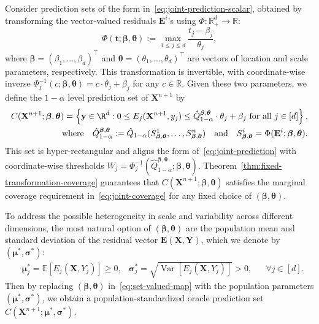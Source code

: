 {\color{blue}
Consider prediction sets of the form in~\eqref{eq:joint-prediction-scalar}, obtained by transforming the vector-valued residuals $\mathbf{E}^i$'s using $\Phi : \mathbb{R}^{d}_+ \to \mathbb{R}$:
\begin{equation}
\Phi(\mathbf t; \boldsymbol \beta, \boldsymbol \theta)
:= \max_{1 \le j \le d} \frac{t_j - \beta_j}{\theta_j},
\label{eq:residual-transformation}
\end{equation}
where $\boldsymbol \beta = (\beta_1, \ldots, \beta_d)^\top$ and $\boldsymbol \theta = (\theta_1, \ldots, \theta_d)^\top$ are vectors of location and scale parameters, respectively. 
This transformation is invertible, with coordinate-wise inverse $\Phi^{-1}_j (c; \boldsymbol \beta, \boldsymbol \theta) = c \cdot \theta_j + \beta_j$ for any $c \in \mathbb{R}$. 
Given these two parameters,  we define the $1-\alpha$ level prediction set of $\mathbf{X}^{n+1}$ by
\begin{equation}\label{eq:set-valued-map}
\begin{aligned}
C(\mathbf{X}^{n+1};\boldsymbol \beta, \boldsymbol \theta) = \left\{\mathbf y \in \R^d: 0\leq E_j(\mathbf{X}^{n+1}, y_j) \leq {\hat{Q}^{\boldsymbol{\beta},\boldsymbol{\theta}}_{1-\alpha} \cdot \theta_j + \beta_j}\text{ for all } j \in [d]\right\},\\
\text{where}\quad
\hat{Q}^{\boldsymbol{\beta},\boldsymbol{\theta}}_{1-\alpha}:= \hat{Q}_{1-\alpha}(S^1_{\boldsymbol{\beta}, \boldsymbol{\theta}},\ldots,S^n_{\boldsymbol{\beta}, \boldsymbol{\theta}})
\quad
\text{and}
\quad
S^i_{\boldsymbol{\beta}, \boldsymbol{\theta}} = \Phi(\mathbf{E}^i; \boldsymbol{\beta}, \boldsymbol{\theta}).
\end{aligned}
\end{equation}
This set is hyper-rectangular and aligns the form of~\eqref{eq:joint-prediction} with coordinate-wise thresholds $W_j = \Phi^{-1}_j (\hat{Q}^{\boldsymbol{\beta},\boldsymbol{\theta}}_{1-\alpha}; \boldsymbol \beta, \boldsymbol \theta)$.
Theorem~\ref{thm:fixed-transformation-coverage} guarantees that $C(\mathbf{X}^{n+1};\boldsymbol \beta, \boldsymbol \theta)$ satisfies the marginal coverage requirement in~\eqref{eq:joint-coverage} for any fixed choice of $(\boldsymbol \beta, \boldsymbol \theta)$.

To address the possible heterogeneity in scale and variability across different dimensions, the most natural option of $(\boldsymbol \beta, \boldsymbol \theta)$ are the population mean and standard deviation of the residual vector $\mathbf E(\mathbf X, \mathbf Y)$, which we denote by $(\boldsymbol\mu^*, \boldsymbol\sigma^*)$:
\begin{align} \label{eq:oracle-mean-std}
&\boldsymbol\mu^*_j = \mathbb{E}[E_j(\mathbf X, Y_j)] \geq 0, 
&\boldsymbol\sigma^*_j = \sqrt{\operatorname{Var}[E_j(\mathbf X, Y_j)]} > 0,
&&\forall j \in [d].
\end{align}
Then by replacing $(\boldsymbol \beta, \boldsymbol \theta)$ in~\eqref{eq:set-valued-map} with the population parameters $(\boldsymbol\mu^*, \boldsymbol\sigma^*)$, we obtain a population-standardized oracle prediction set $C(\mathbf{X}^{n+1}; \boldsymbol\mu^*, \boldsymbol\sigma^*)$. 
}

